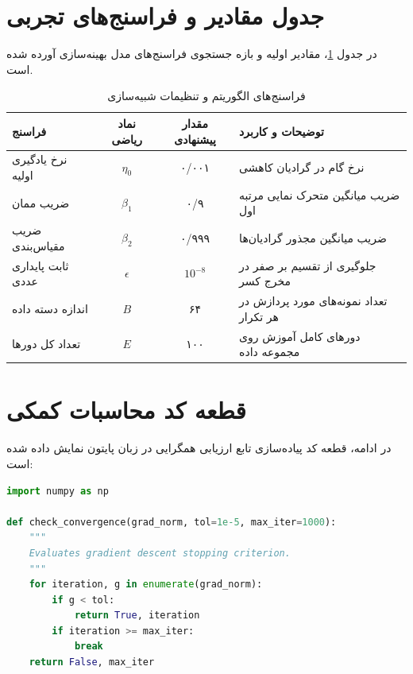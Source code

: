 \section{جدول مقادیر و فراسنج‌های تجربی}
\label{sec:app_params}

در جدول \ref{tab:app_hyperparams}، مقادیر اولیه و بازه جستجوی فراسنج‌های مدل بهینه‌سازی آورده شده است.

\begin{table}[H]
\centering
\caption{فراسنج‌های الگوریتم و تنظیمات شبیه‌سازی}
\label{tab:app_hyperparams}
\begin{tabular}{|l|c|c|p{6cm}|}
\hline
\textbf{فراسنج} & \textbf{نماد ریاضی} & \textbf{مقدار پیشنهادی} & \textbf{توضیحات و کاربرد} \\
\hline
نرخ یادگیری اولیه & $\eta_0$ & ۰/۰۰۱ & نرخ گام در گرادیان کاهشی \\
ضریب ممان & $\beta_1$ & ۰/۹ & ضریب میانگین متحرک نمایی مرتبه اول \\
ضریب مقیاس‌بندی & $\beta_2$ & ۰/۹۹۹ & ضریب میانگین مجذور گرادیان‌ها \\
ثابت پایداری عددی & $\epsilon$ & $10^{-8}$ & جلوگیری از تقسیم بر صفر در مخرج کسر \\
اندازه دسته داده & $B$ & ۶۴ & تعداد نمونه‌های مورد پردازش در هر تکرار \\
تعداد کل دورها & $E$ & ۱۰۰ & دورهای کامل آموزش روی مجموعه داده \\
\hline
\end{tabular}
\end{table}

\section{قطعه کد محاسبات کمکی}
\label{sec:app_code}

در ادامه، قطعه کد پیاده‌سازی تابع ارزیابی همگرایی در زبان پایتون نمایش داده شده است:

\begin{latin}
\begin{lstlisting}[language=Python, caption={پیاده‌سازی پایش همگرایی (\lr{Convergence Monitoring Implementation})}]
import numpy as np

def check_convergence(grad_norm, tol=1e-5, max_iter=1000):
    """
    Evaluates gradient descent stopping criterion.
    """
    for iteration, g in enumerate(grad_norm):
        if g < tol:
            return True, iteration
        if iteration >= max_iter:
            break
    return False, max_iter
\end{lstlisting}
\end{latin}
